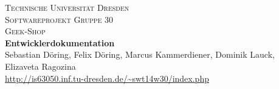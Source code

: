 \begin{titlepage}
\begin{center}
\textsc{\LARGE Technische Universit\"at Dresden} \\[0.5cm]
\textsc{\LARGE Softwareprojekt Gruppe 30}\\[0.5cm]
\textsc{\LARGE Geek-Shop}\\[3cm]
{\Huge \bfseries Entwicklerdokumentation}\\
\vspace*{\fill}
Sebastian D\"oring, Felix D\"oring, Marcus Kammerdiener, Dominik Lauck, Elizaveta Ragozina\\[0.5cm]
\url{http://is63050.inf.tu-dresden.de/~swt14w30/index.php}
\end{center}
\end{titlepage}
